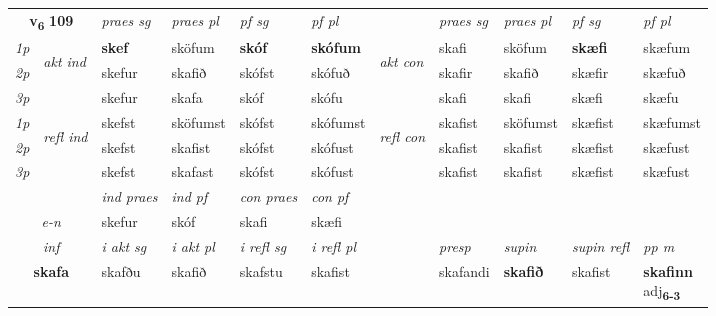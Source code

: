 \noindent
\begin{tabular}{lllllllllll} \toprule
\multicolumn{2}{c}{\textbf{v{\textsubscript{6}}} \Large{\textbf{109}}}  &  \textit{praes sg}  & \textit{praes pl}  &\textit{ pf sg} & \textit{pf pl} &  &  \textit{praes sg}  & \textit{praes pl}  & \textit{pf sg} & \textit{pf pl } \\*
	\cmidrule{3-6} \cmidrule{8-11}
 {\textit{1p}} & \multirow{3}{*}{\begin{turn}{90}\textit{akt ind}\end{turn}} & \textbf{skef} & sköfum & \textbf{skóf} & \textbf{skófum} & \multirow{3}{*}{\begin{turn}{90}\textit{akt con}\end{turn}} &skafi & sköfum & \textbf{skæfi} & skæfum\\*
 {\textit{2p}} &  &  skefur  & skafið & skófst & skófuð & & skafir & skafið & skæfir & skæfuð \\*
{\textit{3p}} &  & skefur & skafa & skóf & skófu & & skafi & skafi& skæfi & skæfu \\*
\cmidrule{3-6} \cmidrule{8-11}
 {\textit{1p}} & \multirow{3}{*}{\begin{turn}{90}\textit{refl ind}\end{turn}}  & skefst & sköfumst & skófst & skófumst & \multirow{3}{*}{\begin{turn}{90}\textit{refl con}\end{turn}}  &skafist & sköfumst & skæfist & skæfumst \\*
 {\textit{2p}} &  & skefst & skafist & skófst & skófust & &skafist & skafist & skæfist & skæfust \\*
 {\textit{3p}}  & & skefst & skafast & skófst & skófust & & skafist & skafist& skæfist & skæfust \\*
\cmidrule{3-6} \cmidrule{8-11}

   & &  \textit{ind praes} & \textit{ind pf} & \textit{con praes} & \textit{con pf} \\*
\multicolumn{2}{c}{ \textit{e-n} } & skefur & skóf & skafi & skæfi \\*

\cmidrule{3-11}
   \multicolumn{2}{c}{\textit{inf}}  & \textit{i akt sg} & \textit{i akt pl} & \textit{i refl sg} & \textit{i refl pl} && \textit{presp} & \textit{supin} & \textit{supin refl} & \textit{pp m} \\*
  \multicolumn{2}{c}{\textbf{skafa}} & skafðu  & skafið & skafstu & skafist && skafandi &  \textbf{skafið} & skafist & \specialcell{\textbf{skafinn} \\ adj\textbf{\textsubscript{6-3}}} \\*
\end{tabular}


